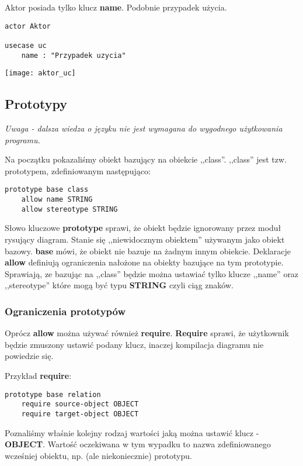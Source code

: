 Aktor posiada tylko klucz \textbf{name}. Podobnie przypadek użycia.
\begin{lstlisting}
actor Aktor

usecase uc
    name : "Przypadek uzycia"
\end{lstlisting}

\begin{center}
\texttt{[image: aktor\_uc]}
\end{center}

\subsection{Prototypy}

\emph{Uwaga - dalsza wiedza o języku nie jest wymagana do wygodnego użytkowania programu.}

Na początku pokazaliśmy obiekt bazujący na obiekcie ,,class''. ,,class'' jest tzw. prototypem, zdefiniowanym następująco:

\begin{lstlisting}
prototype base class
    allow name STRING
    allow stereotype STRING
\end{lstlisting}

Słowo kluczowe \textbf{prototype} sprawi, że obiekt będzie ignorowany przez moduł rysujący diagram. Stanie się ,,niewidocznym obiektem'' używanym jako obiekt bazowy. \textbf{base} mówi, że obiekt nie bazuje na żadnym innym obiekcie. Deklaracje \textbf{allow} definiują ograniczenia nałożone na obiekty bazujące na tym prototypie. Sprawiają, ze bazując na ,,class'' będzie można ustawiać tylko klucze ,,name'' oraz ,,stereotype'' które mogą być typu \textbf{STRING} czyli ciąg znaków.

\subsubsection{Ograniczenia prototypów}

Oprócz \textbf{allow} można używać również \textbf{require}. \textbf{Require} sprawi, że użytkownik będzie zmuszony ustawić podany klucz, inaczej kompilacja diagramu nie powiedzie się.

Przykład \textbf{require}:
\begin{lstlisting}
prototype base relation
    require source-object OBJECT
    require target-object OBJECT
\end{lstlisting}

Poznaliśmy właśnie kolejny rodzaj wartości jaką można ustawić klucz - \textbf{OBJECT}. Wartość oczekiwana w tym wypadku to nazwa zdefiniowanego wcześniej obiektu, np. (ale niekoniecznie) prototypu.

